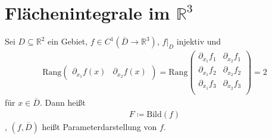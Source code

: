 %

\section{Flächenintegrale im \texorpdfstring{$\mathbb{R}^3$}{R\textsuperscript{3}}}
\addtocounter{thmn}{1}
\setcounter{theorem}{0}


\begin{theorem}[Definition]
  Sei $D \subseteq \mathbb{R}^2$ ein Gebiet, $f \in C^1(\overline{D} \to \mathbb{R}^3)$, $f|_D$ injektiv und
  \begin{align*}
    \mathrm{Rang}\begin{pmatrix} \partial_{x_1} f(x) & \partial_{x_2} f(x) \end{pmatrix}
    = \mathrm{Rang}
    \begin{pmatrix}
      \partial_{x_1} f_1 & \partial_{x_2} f_1 \\
      \partial_{x_1} f_2& \partial_{x_2} f_2 \\
      \partial_{x_1} f_3 & \partial_{x_2} f_3 \\
    \end{pmatrix}
    = 2
  \end{align*}
  für $x \in \overline{D}$. Dann heißt
  \begin{align*}
    F \coloneq \mathrm{Bild}(f)
  \end{align*}
  , $(f,\overline{D})$ heißt Parameterdarstellung von $f$.
\end{theorem}

